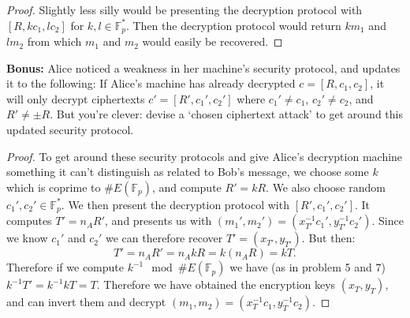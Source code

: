\documentclass[11pt]{article}
\newcommand{\bF}{\mathbb{F}}
\begin{document}
\begin{enumerate}
{\begin{proof}
    Slightly less silly would be presenting the decryption protocol with $[R,kc_1,lc_2]$ for $k,l\in\bF_p^*$.  Then the decryption protocol would return $km_1$ and $lm_2$ from which $m_1$ and $m_2$ would easily be recovered.
  \end{proof}
  \textbf{Bonus: }Alice noticed a weakness in her machine's security protocol, and updates it to the following: If Alice's machine has already decrypted $c = [R,c_1,c_2]$, it will only decrypt ciphertexts $c' = [R',c_1',c_2']$ where $c_1'\not=c_1$, $c_2'\not=c_2$, and $R'\not=\pm R$.  But you're clever: devise a `chosen ciphertext attack' to get around this updated security protocol.
  }
  \begin{proof}
    To get around these security protocols and give Alice's decryption machine something it can't distinguish as related to Bob's message, we choose some $k$ which is coprime to $\#E(\bF_p)$, and compute $R' = kR$.  We also choose random $c_1',c_2'\in\bF_p^*$.  We then present the decryption protocol with $[R',c_1',c_2']$.  It computes $T' = n_AR'$, and presents us with $(m_1',m_2') = (x_{T'}^{-1}c_1',y_{T'}^{-1}c_2')$.  Since we know $c_1'$ and $c_2'$ we can therefore recover $T' = (x_{T'},y_{T'})$.  But then:
    \[T' = n_AR' = n_AkR = k(n_AR) = kT.\]
    Therefore if we compute $k^{-1}\mod \#E(\bF_p)$ we have (as in problem 5 and 7) $k^{-1}T' = k^{-1}kT = T$.  Therefore we have obtained the encryption keys $(x_T,y_T)$, and can invert them and decrypt $(m_1,m_2) = (x_T^{-1}c_1,y_T^{-1}c_2)$.
  \end{proof}
\end{enumerate}
\end{document}
